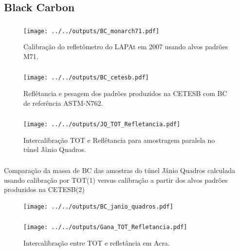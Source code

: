 \subsection{Black Carbon}
\begin{frame}
  \frametitle{}
  \begin{figure}[H]
    \centering
    \texttt{[image: ../../outputs/BC\_monarch71.pdf]}
    \caption{Calibração do refletômetro do LAPAt em 2007 usando alvos padrões M71.
           \label{fig:monarch71}}
  \end{figure}
\end{frame}


\begin{frame}
  \frametitle{}
  \begin{figure}[H]
  	\centering
  	\texttt{[image: ../../outputs/BC\_cetesb.pdf]}
  	\caption{Reflêtancia e pesagem dos padrões produzidos na CETESB com BC 
                   de referência ASTM-N762. \label{fig:bc_cetesb}}
  \end{figure}
\end{frame}


\begin{frame}
  \frametitle{}
  \begin{figure}[H]
    \centering
    \texttt{[image: ../../outputs/JQ\_TOT\_Refletancia.pdf]}
    \caption{Intercalibração TOT e Reflêtancia para amostragem paralela no 
             túnel Jânio Quadros. \label{table:interJQ}}
  \end{figure}
\end{frame}


\begin{frame}
  \frametitle{}
  Comparação da massa de BC das amostras do túnel Jânio Quadros 
                 calculada usando calibração por TOT(1) versus calibração a partir dos 
                 alvos padrões produzidos na CETESB(2)
  \begin{figure}[H]
    \centering
      \texttt{[image: ../../outputs/BC\_janio\_quadros.pdf]}

  \end{figure}
\end{frame}


\begin{frame}
  \frametitle{}
  \begin{figure}[H]
  	\begin{center}
  		\texttt{[image: ../../outputs/Gana\_TOT\_Refletancia.pdf]}
  		\caption{Intercalibração entre TOT e refletância em Acra. \label{fig:interGanaBC}}
  	\end{center}
  \end{figure}
\end{frame}

